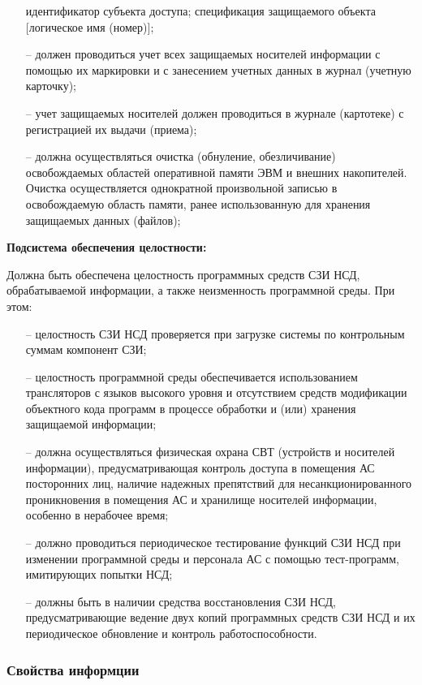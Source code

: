 \begin{itemize}
  идентификатор субъекта доступа;
  спецификация защищаемого объекта [логическое имя (номер)];
  \item[--] должен проводиться учет всех защищаемых носителей информации с помощью их
  маркировки и с занесением учетных данных в журнал (учетную карточку);
  \item[--] учет защищаемых носителей должен проводиться в журнале (картотеке) с регистрацией
   их выдачи (приема);
  \item[--] должна осуществляться очистка (обнуление, обезличивание) освобождаемых 
  областей оперативной памяти ЭВМ и внешних накопителей. Очистка осуществляется однократной 
  произвольной записью в освобождаемую область памяти, ранее использованную для хранения 
  защищаемых данных (файлов);
\end{itemize}

\textbf{Подсистема обеспечения целостности:}

Должна быть обеспечена целостность программных средств СЗИ НСД,
обрабатываемой информации, а также неизменность программной среды. При этом:

\begin{itemize}
  \item[--] целостность СЗИ НСД проверяется при загрузке системы по контрольным
  суммам компонент СЗИ;
  \item[--] целостность программной среды обеспечивается использованием
  трансляторов с языков высокого уровня и отсутствием средств модификации
  объектного кода программ в процессе обработки и (или) хранения
  защищаемой информации;
  \item[--] должна осуществляться физическая охрана СВТ (устройств и носителей
  информации), предусматривающая контроль доступа в помещения АС
  посторонних лиц, наличие надежных препятствий для несанкционированного
  проникновения в помещения АС и хранилище носителей информации,
  особенно в нерабочее время;
  \item[--] должно проводиться периодическое тестирование функций СЗИ НСД при
  изменении программной среды и персонала АС с помощью тест-программ,
  имитирующих попытки НСД;
  \item[--] должны быть в наличии средства восстановления СЗИ НСД,
  предусматривающие ведение двух копий программных средств СЗИ НСД и
  их периодическое обновление и контроль работоспособности.
\end{itemize}

\subsubsection{Свойства информции}

